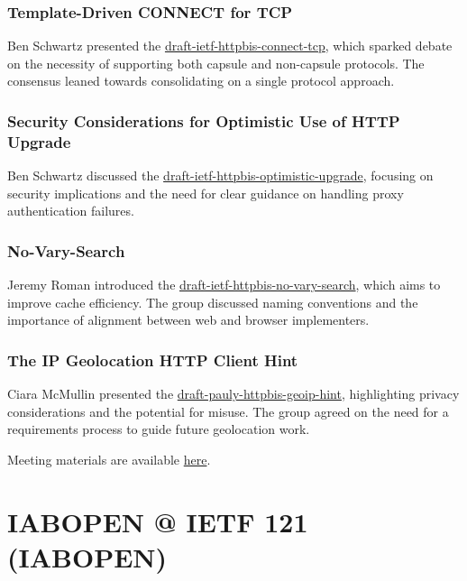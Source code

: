 \documentclass{article}
\begin{document}
\subsubsection{Template-Driven CONNECT for TCP}
Ben Schwartz presented the \href{https://datatracker.ietf.org/doc/draft-ietf-httpbis-connect-tcp/}{draft-ietf-httpbis-connect-tcp}, which sparked debate on the necessity of supporting both capsule and non-capsule protocols. The consensus leaned towards consolidating on a single protocol approach.

\subsubsection{Security Considerations for Optimistic Use of HTTP Upgrade}
Ben Schwartz discussed the \href{https://datatracker.ietf.org/doc/draft-ietf-httpbis-optimistic-upgrade/}{draft-ietf-httpbis-optimistic-upgrade}, focusing on security implications and the need for clear guidance on handling proxy authentication failures.

\subsubsection{No-Vary-Search}
Jeremy Roman introduced the \href{https://datatracker.ietf.org/doc/draft-ietf-httpbis-no-vary-search/}{draft-ietf-httpbis-no-vary-search}, which aims to improve cache efficiency. The group discussed naming conventions and the importance of alignment between web and browser implementers.

\subsubsection{The IP Geolocation HTTP Client Hint}
Ciara McMullin presented the \href{https://datatracker.ietf.org/doc/draft-pauly-httpbis-geoip-hint/}{draft-pauly-httpbis-geoip-hint}, highlighting privacy considerations and the potential for misuse. The group agreed on the need for a requirements process to guide future geolocation work.

Meeting materials are available \href{https://notes.ietf.org/notes-ietf-121-httpbis}{here}.



\newpage

\section{IABOPEN @ IETF 121 (IABOPEN)}
\end{document}
